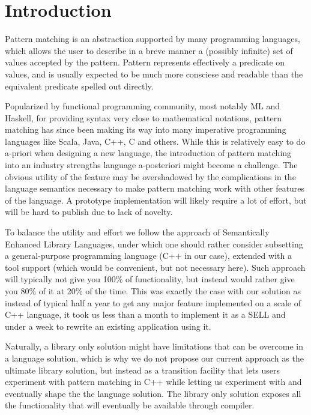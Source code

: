 \documentclass[preprint]{sigplanconf}
\begin{document}
\section{Introduction} %


Pattern matching is an abstraction supported by many programming languages, which 
allows the user to describe in a breve manner a (possibly infinite) set of 
values accepted by the pattern. Pattern represents effectively a predicate on 
values, and is usually expected to be much more consciese and readable than the 
equivalent predicate spelled out directly.

Popularized by functional programming community, most notably ML\cite{ML90} and 
Haskell\cite{Haskell98Book}, for providing syntax very close to mathematical 
notations, pattern matching has since been making its way into many imperative 
programming languages like Scala\cite{Scala2nd}, 
Java\cite{Liu03jmatch:iterable,HydroJ2003}, C++\cite{Prop96}, 
C\cite{Moreau:2003} and others. While this is relatively  
easy to do a-priori when designing a new language, the introduction of pattern 
matching into an industry strengths language a-posteriori might become a 
challenge. The obvious utility of the feature may be overshadowed by the 
complications in the language semantics necessary to make pattern matching work 
with other features of the language. A prototype implementation will likely 
require a lot of effort, but will be hard to publish due to lack of novelty.

To balance the utility and effort we follow the approach of Semantically 
Enhanced Library Languages\cite{SELL}, under which one should rather consider 
subsetting a general-purpose programming language (C++ in our case), extended 
with a tool support (which would be convenient, but not necessary here). Such 
approach will typically not give you 100\% of functionality, but instead would 
rather give you 80\% of it at 20\% of the time. This was exactly the case with 
our solution as instead of typical half a year to get any major feature 
implemented on a scale of C++ language, it took us less than a month to 
implement it as a SELL and under a week to rewrite an existing application using 
it.

Naturally, a library only solution might have limitations that can be overcome in 
a language solution, which is why we do not propose our current approach as the 
ultimate library solution, but instead as a transition facility that lets users 
experiment with pattern matching in C++ while letting us experiment with and 
eventually shape the the language solution. The library only solution exposes 
all the functionality that will eventually be available through compiler.
\end{document}
